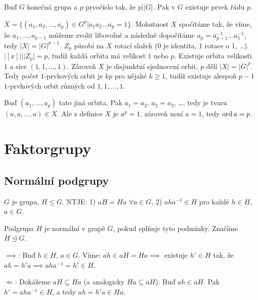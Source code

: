 \documentclass[12pt]{article}                   %
\begin{document}
        \begin{veta}[Cauchyova]
            Buď $G$ konečná grupa a $p$ prvočíslo tak, že $p | |G|$. Pak v $G$ existuje prvek řádu $p$.

            \begin{dukazin}
                $X = \{(a_1, a_2, …, a_p) \in G^{p} | a_1a_2…a_p = 1\}$. Mohutnost $X$ spočítáme tak, že víme, že $a_1, …, a_{p-1}$ můžeme zvolit libovolně a následně dopočítáme $a_p = a_{p-1}^{-1}…a_1^{-1}$, tedy $|X| = |G|^{p-1}$. $Z_p$ působí na $X$ rotací složek (0 je identita, 1 rotace o 1, …). $|[x]| | |Z_p| = p$, tudíž každá orbita má velikost $1$ nebo $p$. Existuje orbita velikosti $1$ a sice $(1, 1, …, 1)$. Zároveň $X$ je disjunktní sjednocení orbit, $p$ dělí $|X| = |G|^p$. Tedy počet $1$-prvkových orbit je $kp$ pro nějaké $k ≥ 1$, tudíž existuje alespoň $p-1$ $1$-prvkových orbit různých od $1, 1, …, 1$.

                Buď $(a_1, …, a_p)$ tato jiná orbita. Pak $a_1 = a_2$, $a_2 = a_3$, …, tedy je tvaru $(a, a, …, a) \in X$. Ale z definice $X$ je $a^p = 1$, zároveň není $a = 1$, tedy $\operatorname{ord} a = p$.
            \end{dukazin}
        \end{veta}

\section{Faktorgrupy}
    \subsection{Normální podgrupy}
        \begin{tvrzeni}
            $G$ je grupa, $H ≤ G$. NTJE:
            1) $aH = Ha$ $\forall a \in G$,
            2) $aha^{-1} \in H$ pro každé $h \in H$, $a \in G$.
        \end{tvrzeni}

        \begin{definicein}
            Podgrupa $H$ je normální v grupě $G$, pokud splňuje tyto podmínky. Značíme $H \trianglelefteq G$.
        \end{definicein}

        \begin{dukazin}
            $\implies$: Buď $h \in H$, $a \in G$. Víme: $ah \in aH = Ha \implies$ existuje $h' \in H$ tak, že $ah = h'a \implies aha^{-1} = h' \in H$.

            $\Leftarrow$: Dokážeme $aH \subseteq Ha$ (a analogicky $Ha \subseteq aH$). Buď $ah \in aH$. Pak $h' = aha^{-1} \in H$, a tedy $ah = h'a \in Ha$.
        \end{dukazin}
\end{document}
